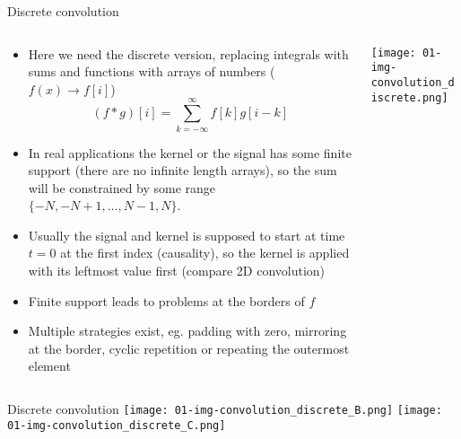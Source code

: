   \begin{frame}{Discrete convolution}
    \begin{columns}[t]
      \begin{column}{0.7\textwidth}
        \begin{itemize}
          \item Here we need the discrete version, replacing integrals with sums and functions with arrays of numbers ($f(x)\rightarrow f[i]$)
            \begin{equation*}
              (f*g)[i] = \sum_{k=-\infty}^{\infty} f[k]g[i-k]
            \end{equation*}
          \item In real applications the kernel or the signal has some finite support (there are no infinite length arrays), so the sum will be constrained by some range $\{-N, -N+1, \dots, N-1, N\}$.
          \item Usually the signal and kernel is supposed to start at time $t=0$ at the first index (causality), so the kernel is applied with its leftmost value first (compare 2D convolution)
          \item Finite support leads to problems at the borders of $f$
          \item Multiple strategies exist, eg. padding with zero, mirroring at the border, cyclic repetition or repeating the outermost element
        \end{itemize}
      \end{column}
      \begin{column}{0.3\textwidth}
        \begin{center}
          \texttt{[image: 01-img-convolution\_discrete.png]}
        \end{center}
      \end{column}
    \end{columns}
  \end{frame}

  \begin{frame}{Discrete convolution}
    \texttt{[image: 01-img-convolution\_discrete\_B.png]}
    \texttt{[image: 01-img-convolution\_discrete\_C.png]}
  \end{frame}

